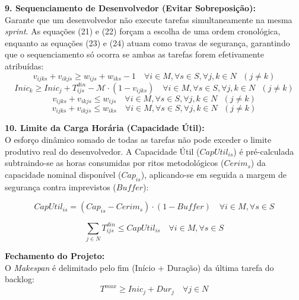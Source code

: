 \documentclass[a4paper,11pt]{article}
\begin{document}
\vspace{0.2cm}
\noindent\textbf{9. Sequenciamento de Desenvolvedor (Evitar Sobreposição):} \\
Garante que um desenvolvedor não execute tarefas simultaneamente na mesma \textit{sprint}. 
As equações (21) e (22) forçam a escolha de uma ordem cronológica, enquanto as 
equações (23) e (24) atuam como travas de segurança, garantindo que o 
sequenciamento só ocorra se ambas as tarefas forem efetivamente atribuídas:
\begin{equation}
    v_{ijks} + v_{ikjs} \ge w_{ijs} + w_{iks} - 1 \quad \forall i \in M, \forall s \in S, \forall j, k \in N \text{ } (j \neq k)
\end{equation}
\begin{equation}
    Inic_{k} \ge Inic_{j} + T^{din}_{ijs} - \mathcal{M} \cdot (1 - v_{ijks}) 
    \quad \forall i \in M, \forall s \in S, \forall j, k \in N \text{ } (j \neq k)
\end{equation}
\begin{equation}
    v_{ijks} + v_{ikjs} \le w_{ijs} \quad \forall i \in M, \forall s \in S, \forall j, k \in N \text{ } (j \neq k)
\end{equation}
\begin{equation}
    v_{ijks} + v_{ikjs} \le w_{iks} \quad \forall i \in M, \forall s \in S, \forall j, k \in N \text{ } (j \neq k)
\end{equation}

\vspace{0.2cm}
\noindent\textbf{10. Limite da Carga Horária (Capacidade Útil):} \\
O esforço dinâmico somado de todas as tarefas não pode exceder o limite produtivo real do desenvolvedor. A Capacidade Útil ($CapUtil_{is}$) é pré-calculada subtraindo-se as horas consumidas por ritos metodológicos ($Cerim_s$) da capacidade nominal disponível ($Cap_{is}$), aplicando-se em seguida a margem de segurança contra imprevistos ($Buffer$):

\begin{equation}
    CapUtil_{is} = (Cap_{is} - Cerim_{s}) \cdot (1 - Buffer) \quad \forall i \in M, \forall s \in S
\end{equation}

\begin{equation}
    \sum_{j \in N} T^{din}_{ijs} \le CapUtil_{is} \quad \forall i \in M, \forall s \in S
\end{equation}

\vspace{0.2cm}
\noindent\textbf{Fechamento do Projeto:} \\
O \textit{Makespan} é delimitado pelo fim (Início + Duração) da última tarefa do backlog:
\begin{equation}
    T^{max} \ge Inic_{j} + Dur_{j} \quad \forall j \in N
\end{equation}



\end{document}
